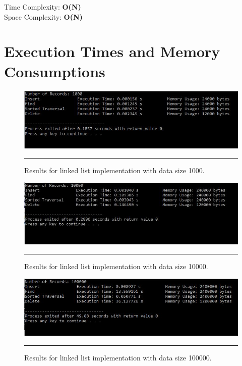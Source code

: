 Time Complexity: \textbf{O(N)} \\
Space Complexity: \textbf{O(N)}

	
\section{Execution Times and Memory Consumptions}
\begin{figure}[H]
	\centering
	\includegraphics[scale =0.7]{./Figures/List1000.jpg}
	\rule{35em}{0.5pt}
	\caption{Results for linked list implementation with data size 1000.}
	\label{fig:List 1000}
\end{figure}

\begin{figure}[H]
	\centering
	\includegraphics[scale =0.7]{./Figures/List10000.jpg}
	\rule{35em}{0.5pt}
	\caption{Results for linked list implementation with data size 10000.}
	\label{fig:List 10000}
\end{figure}

\begin{figure}[H]
	\centering
	\includegraphics[scale =0.7]{./Figures/List100000.jpg}
	\rule{35em}{0.5pt}
	\caption{Results for linked list implementation with data size 100000.}
	\label{fig:List 100000}
\end{figure}